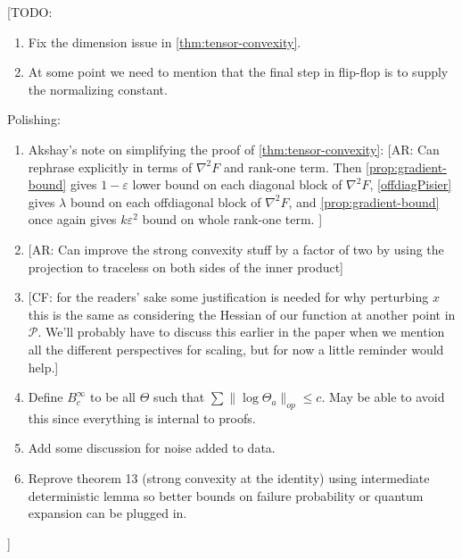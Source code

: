 \documentclass[aos]{imsart}
\theoremstyle{definition}
\newcommand{\eps}{\varepsilon}
\newcommand{\SPD}{\mathcal{P}}
\newcommand{\samp}{x}
\newcommand{\CF}[1]{{\color{purple}[CF: #1]}}
\newcommand{\AR}[1]{{\color{orange}[AR: #1]}}
\newcommand{\TODO}[1]{{\color{blue}[TODO: #1]}}
\begin{document}
\TODO{
\begin{enumerate}
\item Fix the dimension issue in \cref{thm:tensor-convexity}.
\item At some point we need to mention that the final step in flip-flop is to supply the normalizing constant.
\end{enumerate}
Polishing:
\begin{enumerate}
\item Akshay's note on simplifying the proof of \cref{thm:tensor-convexity}: \AR{Can rephrase explicitly in terms of $\nabla^{2} F$ and rank-one term. Then \cref{prop:gradient-bound} gives $1-\eps$ lower bound on each diagonal block of $\nabla^{2} F$, \cref{offdiagPisier} gives $\lambda$ bound on each offdiagonal block of $\nabla^{2} F$, and \cref{prop:gradient-bound} once again gives $k \eps^{2}$ bound on whole rank-one term.  }
\item \AR{Can improve the strong convexity stuff by a factor of two by using the projection to traceless on both sides of the inner product}
\item \CF{for the readers' sake some justification is needed for why perturbing $\samp$ this is the same as considering the Hessian of our function at another point in $\SPD$. We'll probably have to discuss this earlier in the paper when we mention all the different perspectives for scaling, but for now a little reminder would help.}
\item Define $B^\infty_c$ to be all $\Theta$ such that $\sum \|\log \Theta_a\|_{op} \leq c$. May be able to avoid this since everything is internal to proofs.
\item Add some discussion for noise added to data.
\item Reprove theorem 13 (strong convexity at the identity) using intermediate deterministic lemma so better bounds on failure probability or quantum expansion can be plugged in.
\end{enumerate}

}


\end{document}
